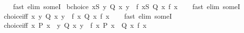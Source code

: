 \begin{isabellebody}
%
\isadelimproof
\ \ %
\endisadelimproof
%
\isatagproof
{}\isamarkupfalse%
\ {\isacharparenleft}{\kern0pt}fast\ elim{\isacharcolon}{\kern0pt}\ someI{\isacharparenright}{\kern0pt}%
\endisatagproof
{\isafoldproof}%
%
\isadelimproof
\isanewline
%
\endisadelimproof
\isanewline
{}\isamarkupfalse%
\ bchoice{\isacharcolon}{\kern0pt}\ {\isachardoublequoteopen}{\isasymforall}x{\isasymin}S{\isachardot}{\kern0pt}\ {\isasymexists}y{\isachardot}{\kern0pt}\ Q\ x\ y\ {\isasymLongrightarrow}\ {\isasymexists}f{\isachardot}{\kern0pt}\ {\isasymforall}x{\isasymin}S{\isachardot}{\kern0pt}\ Q\ x\ {\isacharparenleft}{\kern0pt}f\ x{\isacharparenright}{\kern0pt}{\isachardoublequoteclose}\isanewline
%
\isadelimproof
\ \ %
\endisadelimproof
%
\isatagproof
{}\isamarkupfalse%
\ {\isacharparenleft}{\kern0pt}fast\ elim{\isacharcolon}{\kern0pt}\ someI{\isacharparenright}{\kern0pt}%
\endisatagproof
{\isafoldproof}%
%
\isadelimproof
\isanewline
%
\endisadelimproof
\isanewline
{}\isamarkupfalse%
\ choice{\isacharunderscore}{\kern0pt}iff{\isacharcolon}{\kern0pt}\ {\isachardoublequoteopen}{\isacharparenleft}{\kern0pt}{\isasymforall}x{\isachardot}{\kern0pt}\ {\isasymexists}y{\isachardot}{\kern0pt}\ Q\ x\ y{\isacharparenright}{\kern0pt}\ {\isasymlongleftrightarrow}\ {\isacharparenleft}{\kern0pt}{\isasymexists}f{\isachardot}{\kern0pt}\ {\isasymforall}x{\isachardot}{\kern0pt}\ Q\ x\ {\isacharparenleft}{\kern0pt}f\ x{\isacharparenright}{\kern0pt}{\isacharparenright}{\kern0pt}{\isachardoublequoteclose}\isanewline
%
\isadelimproof
\ \ %
\endisadelimproof
%
\isatagproof
{}\isamarkupfalse%
\ {\isacharparenleft}{\kern0pt}fast\ elim{\isacharcolon}{\kern0pt}\ someI{\isacharparenright}{\kern0pt}%
\endisatagproof
{\isafoldproof}%
%
\isadelimproof
\isanewline
%
\endisadelimproof
\isanewline
{}\isamarkupfalse%
\ choice{\isacharunderscore}{\kern0pt}iff{\isacharprime}{\kern0pt}{\isacharcolon}{\kern0pt}\ {\isachardoublequoteopen}{\isacharparenleft}{\kern0pt}{\isasymforall}x{\isachardot}{\kern0pt}\ P\ x\ {\isasymlongrightarrow}\ {\isacharparenleft}{\kern0pt}{\isasymexists}y{\isachardot}{\kern0pt}\ Q\ x\ y{\isacharparenright}{\kern0pt}{\isacharparenright}{\kern0pt}\ {\isasymlongleftrightarrow}\ {\isacharparenleft}{\kern0pt}{\isasymexists}f{\isachardot}{\kern0pt}\ {\isasymforall}x{\isachardot}{\kern0pt}\ P\ x\ {\isasymlongrightarrow}\ Q\ x\ {\isacharparenleft}{\kern0pt}f\ x{\isacharparenright}{\kern0pt}{\isacharparenright}{\kern0pt}{\isachardoublequoteclose}\isanewline
%
\isadelimproof
\ \ %
\endisadelimproof
%
\isatagproof
{}\isamarkupfalse%

\end{isabellebody}
